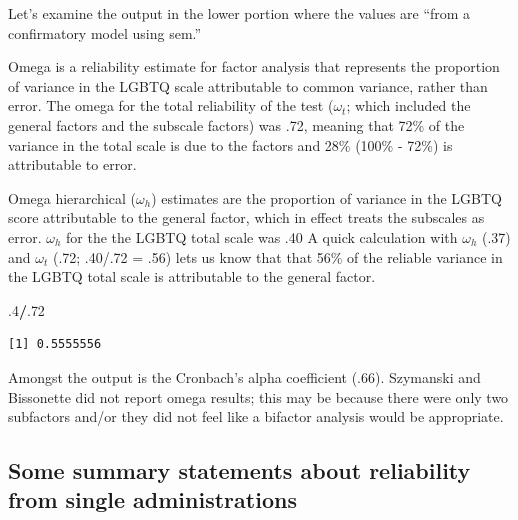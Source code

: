\documentclass[
  english,
]{book}
\newenvironment{Shaded}{\begin{snugshade}}{\end{snugshade}}
\newcommand{\DecValTok}[1]{\textcolor[rgb]{0.00,0.00,0.81}{#1}}
\newcommand{\FloatTok}[1]{\textcolor[rgb]{0.00,0.00,0.81}{#1}}
\newcommand{\NormalTok}[1]{#1}
\newcommand{\OperatorTok}[1]{\textcolor[rgb]{0.81,0.36,0.00}{\textbf{#1}}}
\begin{document}
Let's examine the output in the lower portion where the values are ``from a confirmatory model using sem.''

Omega is a reliability estimate for factor analysis that represents the proportion of variance in the LGBTQ scale attributable to common variance, rather than error. The omega for the total reliability of the test (\(\omega_{t}\); which included the general factors and the subscale factors) was .72, meaning that 72\% of the variance in the total scale is due to the factors and 28\% (100\% - 72\%) is attributable to error.

Omega hierarchical (\(\omega_{h}\)) estimates are the proportion of variance in the LGBTQ score attributable to the general factor, which in effect treats the subscales as error. \(\omega_{h}\) for the the LGBTQ total scale was .40 A quick calculation with \(\omega_{h}\) (.37) and \(\omega_{t}\) (.72; .40/.72 = .56) lets us know that that 56\% of the reliable variance in the LGBTQ total scale is attributable to the general factor.

\begin{Shaded}
\begin{Highlighting}[]
\FloatTok{.4}\OperatorTok{/}\NormalTok{.}\DecValTok{72}
\end{Highlighting}
\end{Shaded}

\begin{verbatim}
[1] 0.5555556
\end{verbatim}

Amongst the output is the Cronbach's alpha coefficient (.66). Szymanski and Bissonette \citep{szymanski_perceptions_2020} did not report omega results; this may be because there were only two subfactors and/or they did not feel like a bifactor analysis would be appropriate.

\hypertarget{some-summary-statements-about-reliability-from-single-administrations}{%
\subsection{Some summary statements about reliability from single administrations}\label{some-summary-statements-about-reliability-from-single-administrations}}
\end{document}
